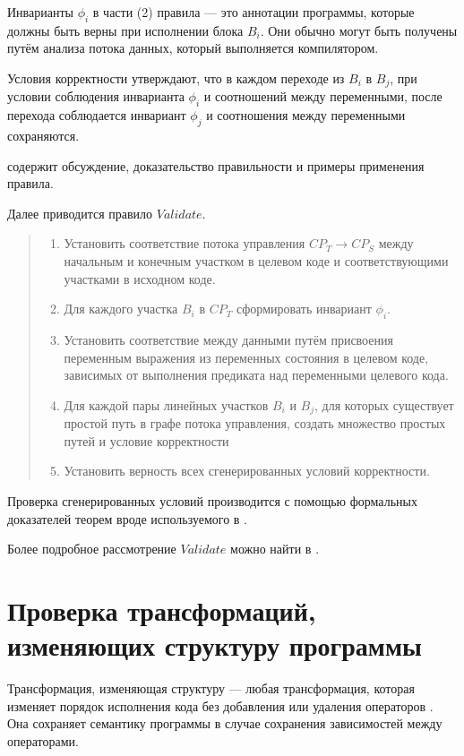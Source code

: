 Инварианты $\phi_{i}$ в части (2) правила --- это аннотации программы, которые должны быть верны при исполнении блока $B_{i}$. Они обычно могут быть получены путём анализа потока данных, который выполняется компилятором.

Условия корректности утверждают, что в каждом переходе из $B_{i}$ в $B_{j}$, при условии соблюдения инварианта $\phi_{i}$ и соотношений между переменными, после перехода соблюдается инвариант $\phi_{j}$ и соотношения между переменными сохраняются.

\cite{ZPFG02} содержит обсуждение, доказательство правильности и примеры применения правила.

Далее приводится правило $Validate$.

\begin{quote}
    \begin{enumerate}
        \item Установить соответствие потока управления $CP_{T} \rightarrow CP_{S}$ между начальным и конечным участком в целевом коде и соответствующими участками в исходном коде.
        \item Для каждого участка $B_{i}$ в $CP_{T}$ сформировать инвариант $\phi_{i}$.
        \item Установить соответствие между данными путём присвоения переменным выражения из переменных состояния в целевом коде, зависимых от выполнения предиката над переменными целевого кода.
        \item Для каждой пары линейных участков $B_{i}$ и $B_{j}$, для которых существует простой путь в графе потока управления, создать множество простых путей и условие корректности
        \item Установить верность всех сгенерированных условий корректности.
    \end{enumerate}
\end{quote}

Проверка сгенерированных условий производится с помощью формальных доказателей теорем вроде используемого в \cite{PRSS99}.

Более подробное рассмотрение $Validate$ можно найти в \cite{ZuckPFGH02}.

\chapter{Проверка трансформаций, изменяющих структуру программы}

Трансформация, изменяющая структуру --- любая трансформация, которая изменяет порядок исполнения кода без добавления или удаления операторов \cite{AK02}. Она сохраняет семантику программы в случае сохранения зависимостей между операторами.

